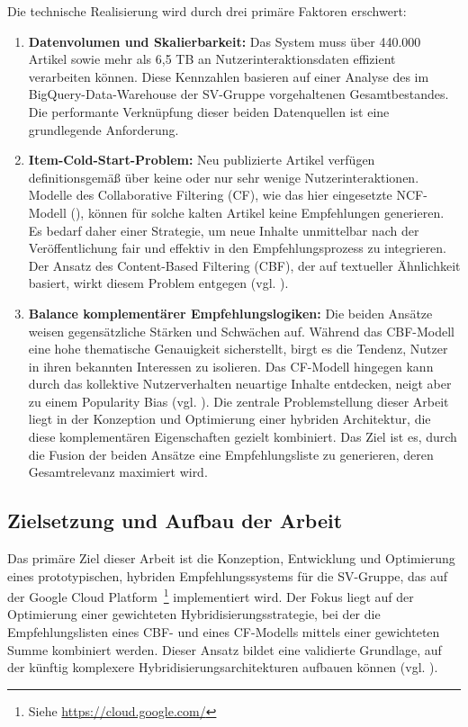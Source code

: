 Die technische Realisierung wird durch drei primäre Faktoren erschwert:

\begin{enumerate}
    \item \textbf{Datenvolumen und Skalierbarkeit:} Das System muss über 440.000 Artikel sowie mehr als 6,5 TB an 
    Nutzerinteraktionsdaten effizient verarbeiten können. Diese Kennzahlen basieren auf einer Analyse des im 
    BigQuery-Data-Warehouse der \ac{SV-Gruppe} vorgehaltenen Gesamtbestandes. Die performante Verknüpfung dieser beiden 
    Datenquellen ist eine grundlegende Anforderung.
    
    \item \textbf{Item-Cold-Start-Problem:} Neu publizierte Artikel verfügen definitionsgemäß über keine 
    oder nur sehr wenige Nutzerinteraktionen. Modelle des Collaborative Filtering (CF), wie das hier eingesetzte \ac{NCF}-Modell (\cite{he_neural_2017}), 
    können für solche kalten Artikel keine Empfehlungen generieren. Es bedarf daher einer Strategie, 
    um neue Inhalte unmittelbar nach der Veröffentlichung fair und effektiv in den Empfehlungsprozess zu integrieren. 
    Der Ansatz des Content-Based Filtering (CBF), der auf textueller Ähnlichkeit basiert, wirkt diesem Problem entgegen (vgl. \cite{Lops_CBRS_SOTA_2011}).
    
    \item \textbf{Balance komplementärer Empfehlungslogiken:} Die beiden Ansätze weisen gegensätzliche 
    Stärken und Schwächen auf. Während das \ac{CBF}-Modell eine hohe thematische Genauigkeit sicherstellt, 
    birgt es die Tendenz, Nutzer in ihren bekannten Interessen zu isolieren. 
    Das \ac{CF}-Modell hingegen kann durch das kollektive Nutzerverhalten neuartige Inhalte entdecken, 
    neigt aber zu einem Popularity Bias (vgl. \cite{Abdollahpouri_Popularity_Bias_2019}). 
    Die zentrale Problemstellung dieser Arbeit liegt in der Konzeption und Optimierung einer 
    hybriden Architektur, die diese komplementären Eigenschaften gezielt kombiniert. 
    Das Ziel ist es, durch die Fusion der beiden Ansätze eine Empfehlungsliste zu generieren, 
    deren Gesamtrelevanz maximiert wird.
\end{enumerate}

\subsection{Zielsetzung und Aufbau der Arbeit}
\label{sec:zielsetzung}
Das primäre Ziel dieser Arbeit ist die Konzeption, Entwicklung und Optimierung eines prototypischen, 
hybriden Empfehlungssystems für die \ac{SV-Gruppe}, das auf der Google Cloud Platform~\footnote{Siehe \url{https://cloud.google.com/}} implementiert wird. 
Der Fokus liegt auf der Optimierung einer gewichteten Hybridisierungsstrategie, bei der die Empfehlungslisten 
eines \ac{CBF}- und eines \ac{CF}-Modells mittels einer gewichteten Summe 
kombiniert werden. Dieser Ansatz bildet eine validierte Grundlage, auf der künftig komplexere 
Hybridisierungsarchitekturen aufbauen können (vgl. \cite{burke_hybrid_2002}).

